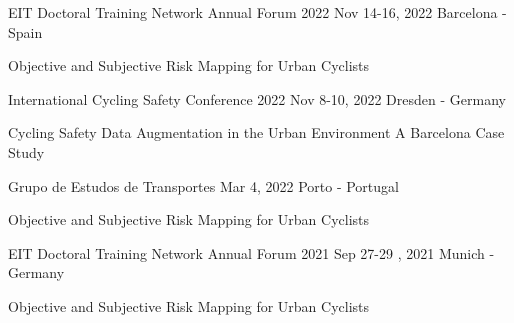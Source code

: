 

\begin{cventries}

\cventrypresentation
	{EIT Doctoral Training Network Annual Forum 2022} %
	{Nov 14-16, 2022} %
	{Barcelona - Spain} %
	{
		\begin{cvpresentationitems} %
			\item {} {Objective and Subjective Risk Mapping for Urban Cyclists}
		\end{cvpresentationitems}
	}

  \cventrypresentation
	{International Cycling Safety Conference 2022} %
	{Nov 8-10, 2022} %
	{Dresden - Germany} %
	{
		\begin{cvpresentationitems} %
			\item {} {Cycling Safety Data Augmentation in the Urban Environment\: A Barcelona Case Study}
		\end{cvpresentationitems}
	}

  \cventrypresentation
    {Grupo de Estudos de Transportes} %
    {Mar 4, 2022} %
    {Porto - Portugal} %
    {
      \begin{cvpresentationitems} %
        \item {} {Objective and Subjective Risk Mapping for Urban Cyclists}
      \end{cvpresentationitems}
    }


  \cventrypresentation
    {EIT Doctoral Training Network Annual Forum 2021} %
    {Sep 27-29 , 2021} %
    {Munich - Germany} %
    {
      \begin{cvpresentationitems} %
        \item {} {Objective and Subjective Risk Mapping for Urban Cyclists}
      \end{cvpresentationitems}
    }


\end{cventries}
